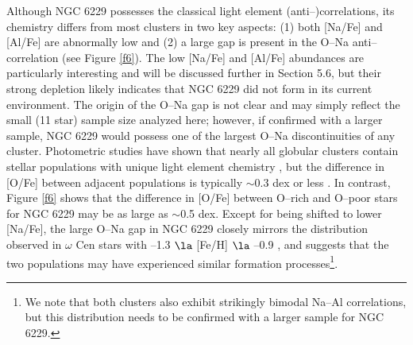 \documentclass[12pt,preprint]{emulateapj}
\begin{document}
Although NGC 6229 possesses the classical light element (anti--)correlations,
its chemistry differs from most clusters in two key aspects: (1) both [Na/Fe]
and [Al/Fe] are abnormally low and (2) a large gap is present in the O--Na
anti--correlation (see Figure \ref{f6}).  The low [Na/Fe] and [Al/Fe] 
abundances are particularly interesting and will be discussed further in
Section 5.6, but their strong depletion likely indicates that NGC 6229 did not
form in its current environment.  The origin of the O--Na gap is not clear and
may simply reflect the small (11 star) sample size analyzed here; however, if
confirmed with a larger sample, NGC 6229 would possess one of the largest
O--Na discontinuities of any cluster.  Photometric studies have shown
that nearly all globular clusters contain stellar populations with unique
light element chemistry \citep[e.g.,][]{Piotto15,Milone17}, but the difference 
in [O/Fe] between adjacent populations is typically $\sim$0.3 dex or less 
\citep[e.g.,][]{Yong05,Marino08,Gratton12b,Carretta13,Kacharov13,Carretta15,
Johnson17b}.  In contrast, Figure \ref{f6} shows that the difference in [O/Fe]
between O--rich and O--poor stars for NGC 6229 may be as large as $\sim$0.5 dex.
Except for being shifted to lower [Na/Fe], the large O--Na gap in NGC 6229 
closely mirrors the distribution observed in $\omega$ Cen stars with --1.3 
$\la$ [Fe/H] $\la$ --0.9 \citep{Johnson10,Marino11a}, and suggests that the
two populations may have experienced similar formation processes\footnote{We 
note that both clusters also exhibit strikingly bimodal Na--Al correlations, 
but this distribution needs to be confirmed with a larger sample for 
NGC 6229.}.

\begin{figure*}
\caption{Left: light element abundance variations between [O/Fe], [Na/Fe],
[Mg/Fe], and [Si/Fe] are shown for NGC 6229 (filled red circles).  The data
indicate that O--Na and Na--Mg are anti--correlated while [Na/Fe] and [Si/Fe]
exhibit a mild correlation.  A strong correlation between [Na/Fe] and [Al/Fe]
exists, but is omitted due to the small number of [Al/Fe] measurements.
Right: similar plots are shown comparing the light element variations between
NGC 6229, NGC 1851 \citep[open blue squares;][]{Carretta11}, and M 75
\citep[open green pentagons;][]{Kacharov13}.  For all three clusters, stars with
heavy element enhancements are indicated with large open symbols.}
\label{f6}
\end{figure*}
\end{document}
